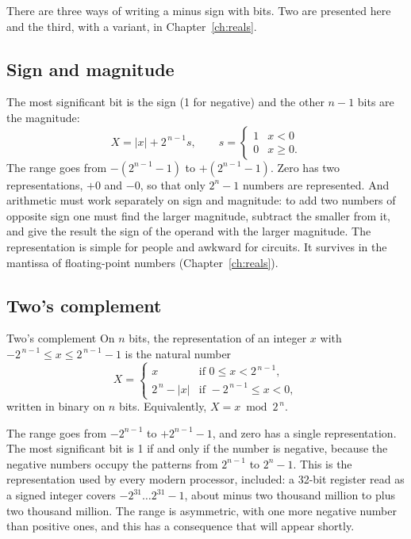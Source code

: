 There are three ways of writing a minus sign with bits. Two are presented
here and the third, with a variant, in Chapter~\ref{ch:reals}.

\subsection{Sign and magnitude}

The most significant bit is the sign (1 for negative) and the other $n-1$ bits
are the magnitude:
\[
X = |x| + 2^{\,n-1}s,\qquad s=\begin{cases}1 & x<0\\ 0 & x\ge 0.\end{cases}
\]
The range goes from $-(2^{n-1}-1)$ to $+(2^{n-1}-1)$. Zero has two
representations, $+0$ and $-0$, so that only $2^{n}-1$ numbers are
represented. And arithmetic must work separately on sign and magnitude: to
add two numbers of opposite sign one must find the larger magnitude, subtract
the smaller from it, and give the result the sign of the operand with the
larger magnitude. The representation is simple for people and awkward for
circuits. It survives in the mantissa of floating-point numbers
(Chapter~\ref{ch:reals}).

\subsection{Two's complement}

\begin{definition}{Two's complement}
On $n$ bits, the  representation of an integer $x$ with
$-2^{\,n-1}\le x\le 2^{\,n-1}-1$ is the natural number
\[
X=\begin{cases} x & \text{if } 0\le x<2^{\,n-1},\\[2pt]
2^{\,n}-|x| & \text{if } -2^{\,n-1}\le x<0,\end{cases}
\]
written in binary on $n$ bits. Equivalently, $X = x \bmod 2^{\,n}$.
\end{definition}

The range goes from $-2^{n-1}$ to $+2^{n-1}-1$, and zero has a single
representation. The most significant bit is 1 if and only if the number is
negative, because the negative numbers occupy the patterns from $2^{n-1}$ to
$2^{n}-1$. This is the representation used by every modern processor, \riscv
included: a 32-bit register read as a signed integer covers
$-2^{31}\ldots 2^{31}-1$, about minus two thousand million to plus two
thousand million. The range is asymmetric, with one more negative number than
positive ones, and this has a consequence that will appear shortly.

